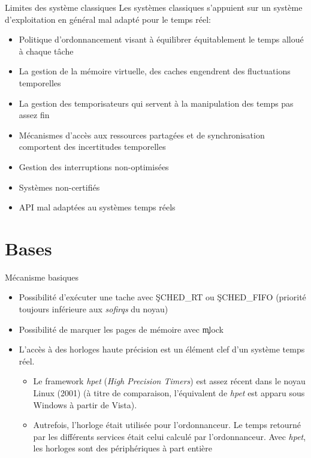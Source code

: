 \begin{frame}{Limites des système classiques}
  Les systèmes classiques s'appuient  sur un système d'exploitation en
  général mal adapté pour le temps réel:
  \begin{itemize}
  \item Politique d'ordonnancement visant à équilibrer équitablement le
    temps alloué à chaque tâche
  \item La gestion de la  mémoire virtuelle, des caches engendrent des
    fluctuations temporelles
  \item La  gestion des temporisateurs  qui servent à  la manipulation
    des temps pas assez fin
  \item   Mécanismes   d'accès   aux   ressources  partagées   et   de
    synchronisation comportent des incertitudes temporelles
  \item Gestion des interruptions non-optimisées
  \item Systèmes non-certifiés
  \item API mal adaptées au systèmes temps réels
  \end{itemize}
\end{frame}

\section{Bases}

\begin{frame}{Mécanisme basiques}
  \begin{itemize}
  \item  Possibilité  d'exécuter  une  tache avec  \c{SCHED_RT}  ou
    \c{SCHED_FIFO} (priorité toujours inférieure aux \emph{sofirqs} du noyau)
  \item Possibilité de marquer les pages de mémoire avec \c{mlock}
  \item L'accès  à des  horloges haute précision  est un  élément clef
    d'un système temps réel.
    \begin{itemize}
    \item Le framework  \emph{hpet} (\emph{High Precision Timers}) est
      assez récent dans le noyau Linux (2001) (à titre de comparaison,
      l'équivalent de \emph{hpet} est  apparu sous Windows à partir de
      Vista).
    \item Autrefois, l'horloge  était utilisée pour l'ordonnanceur. Le
      temps retourné  par les différents services  était celui calculé
      par l'ordonnanceur.   Avec \emph{hpet}, les  horloges sont des
      périphériques à part entière
    \end{itemize}
  \end{itemize}
\end{frame}


